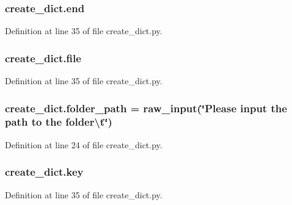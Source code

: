 \subsubsection[{\texorpdfstring{end}{end}}]{\setlength{\rightskip}{0pt plus 5cm}create\+\_\+dict.\+end}\hypertarget{namespacecreate__dict_ad4b19f0708a580bdf8ef5f3b5a08d1d2}{}\label{namespacecreate__dict_ad4b19f0708a580bdf8ef5f3b5a08d1d2}


Definition at line 35 of file create\+\_\+dict.\+py.

\subsubsection[{\texorpdfstring{file}{file}}]{\setlength{\rightskip}{0pt plus 5cm}create\+\_\+dict.\+file}\hypertarget{namespacecreate__dict_a0384d7d11a827e9e7084abff1ac79190}{}\label{namespacecreate__dict_a0384d7d11a827e9e7084abff1ac79190}


Definition at line 35 of file create\+\_\+dict.\+py.

\subsubsection[{\texorpdfstring{folder\+\_\+path}{folder_path}}]{\setlength{\rightskip}{0pt plus 5cm}create\+\_\+dict.\+folder\+\_\+path = raw\+\_\+input(\char`\"{}Please input the path to the folder\textbackslash{}t\char`\"{})}\hypertarget{namespacecreate__dict_a94c0ed0928396d28700235a31621124f}{}\label{namespacecreate__dict_a94c0ed0928396d28700235a31621124f}


Definition at line 24 of file create\+\_\+dict.\+py.

\subsubsection[{\texorpdfstring{key}{key}}]{\setlength{\rightskip}{0pt plus 5cm}create\+\_\+dict.\+key}\hypertarget{namespacecreate__dict_aef9478241bf84f48b590aab0c0bbfc63}{}\label{namespacecreate__dict_aef9478241bf84f48b590aab0c0bbfc63}


Definition at line 35 of file create\+\_\+dict.\+py.

